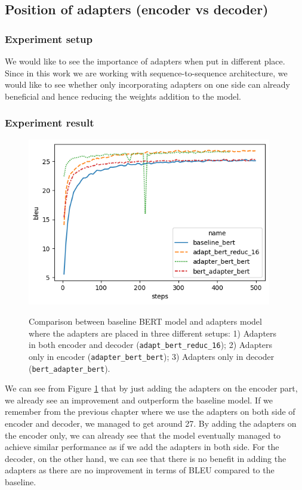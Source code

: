 \subsection{Position of adapters (encoder vs decoder)}
\subsubsection{Experiment setup}
We would like to see the importance of adapters when put in different place. Since in this work we are working with sequence-to-sequence architecture, we would like to see whether only incorporating adapters on one side can already beneficial and hence reducing the weights addition to the model.

\subsubsection{Experiment result}

\begin{figure}[h]
    {\includegraphics[width=0.95\textwidth]{img/bert_pos.png}}
    \centering
    \caption{Comparison between baseline BERT model and adapters model where the adapters are placed in three different setups: 1) Adapters in both encoder and decoder (\texttt{adapt\_bert\_reduc\_16}); 2) Adapters only in encoder (\texttt{adapter\_bert\_bert}); 3) Adapters only in decoder (\texttt{bert\_adapter\_bert}).}
    \label{img:adapt_bert_pos}
\end{figure}
We can see from Figure \ref{img:adapt_bert_pos} that by just adding the adapters on the encoder part, we already see an improvement and outperform the baseline model. If we remember from the previous chapter where we use the adapters on both side of encoder and decoder, we managed to get around 27. By adding the adapters on the encoder only, we can already see that the model eventually managed to achieve similar performance as if we add the adapters in both side. For the decoder, on the other hand, we can see that there is no benefit in adding the adapters as there are no improvement in terms of BLEU compared to the baseline.

